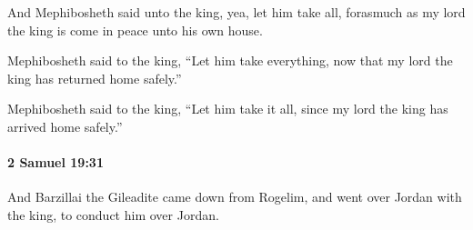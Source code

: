 			\begin{versebox}
					\item[BHS] 
					\item[ASV] And Mephibosheth said unto the king, yea, let him take all, forasmuch as my lord the king is come in peace unto his own house.
					\item[NIV] Mephibosheth said to the king, “Let him take everything, now that my lord the king has returned home safely.”
					\item[NRSV] Mephibosheth said to the king, “Let him take it all, since my lord the king has arrived home safely.”
			\end{versebox}

		\paragraph{2 Samuel 19:31} %
			\label{2SAMUEL-19-31}

			And Barzillai the Gileadite came down from Rogelim, and went over Jordan with the king, to conduct him over Jordan.

